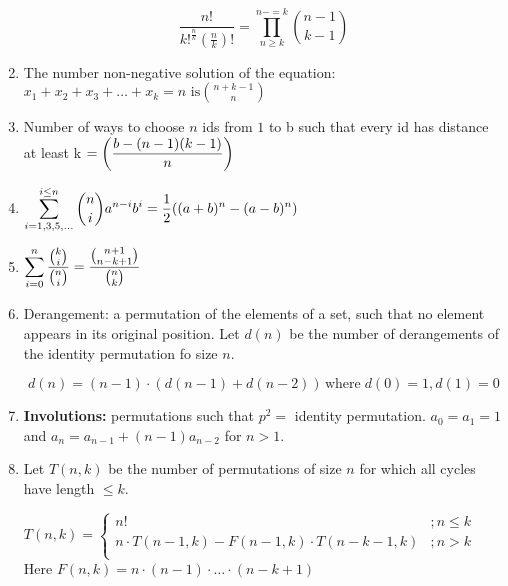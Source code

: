 \begin{enumerate}
                \[\displaystyle \frac{n!}{k!^{\frac{n}{k}} \left( \frac{n}{k} \right) !}= \prod \limits_{n \geq
                k}^{n-=k}{n-1
                \choose k-1}\]
            
            \item The number non-negative solution of the equation: $\displaystyle x_1+x_2+x_3+…+x_k=n \text{ is}{n+k-1
                \choose
                n}$
            \item Number of ways to choose $n$ ids from $\displaystyle 1$ to b such that every id has distance at least k
                $\displaystyle \displaystyle =\left( \frac{b-(n-1)(k-1)}{n} \right)$
            \item $\displaystyle \displaystyle \sum \limits_{i=1,3,5,\dots}^{i\leq n} \binom{n}{i} a^{n-i}b^i =
                \frac{1}{2}
                ((a+b)^n-(a-b)^n)$
            \item $\displaystyle \displaystyle \sum \limits_{i=0}^{n} \dfrac{\binom{k}{i}}{\binom{n}{i}} =
                \dfrac{\binom{n+1}{n-k+1}}{\binom{n}{k}}$
            \item 
                Derangement: a permutation of the elements of a set, such that no element appears in
                    its
                    original position. Let $d(n)$ be the number of derangements of the identity permutation fo size $n$.
                

                \[d(n)=(n-1) \cdot (d(n-1)+d(n-2)) \, \text{where}\;d(0)=1,d(1)=0\]
            
            \item \textbf{Involutions:} permutations such that $\displaystyle p^2 =$ identity permutation.
                $\displaystyle
                a_0 = a_1 = 1$ and $\displaystyle a_n=a_{n-1} + (n-1)a_{n-2}$ for $n>1$.
            \item 
                Let $T(n,k)$ be the number of permutations of size $n$ for which all cycles have length
                    $\displaystyle
                    \leq
                    k$.

                \(T(n, k)=
                    \begin{cases}
                    n! & ; n \le k\\
                    n \cdot T(n-1, k) - F(n-1, k) \cdot T(n-k-1, k) & ;n > k \\
                    \end{cases}\)
                    Here $\displaystyle F(n, k) = n \cdot (n - 1) \cdot … \cdot (n - k + 1)$


\end{enumerate}
